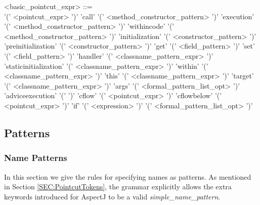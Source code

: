 \begin{minipage}{6in}
\begin{blue}
\begin{grammar}
<basic_pointcut_expr> ::= \hspace{1in} \\
       '(' <pointcut_expr> ')'
\alt   'call' '(' <method_constructor_pattern> ')'
\alt   'execution' '(' <method_constructor_pattern> ')'
\alt   'withincode' '(' <method_constructor_pattern> ')'
\alt   'initialization' '(' <constructor_pattern> ')'
\alt   'preinitialization' '(' <constructor_pattern> ')'
\alt   'get' '(' <field_pattern> ')'
\alt   'set' '(' <field_pattern> ')'
\alt   'handler' '(' <classname_pattern_expr> ')'
\alt   'staticinitialization' '(' <classname_pattern_expr> ')'
\alt   'within' '(' <classname_pattern_expr> ')'
\alt   'this' '(' <classname_pattern_expr> ')'
\alt   'target' '(' <classname_pattern_expr> ')'
\alt   'args' '(' <formal_pattern_list_opt> ')'
\alt   'adviceexecution' '(' ')'
\alt   'cflow' '(' <pointcut_expr> ')'
\alt   'cflowbelow' '(' <pointcut_expr> ')'
\alt   'if' '(' {\red <expression> } ')'
 '(' <formal_pattern_list_opt> ')'
\end{grammar}
\end{blue}
\end{minipage}


\subsection{Patterns}

\subsubsection{Name Patterns \label{SEC:NamePatterns}}

In this section we give the rules for specifying names as
patterns.   As mentioned in Section \ref{SEC:PointcutTokens}, 
the grammar explicitly allows the extra keywords introduced for
AspectJ to be a valid {\em simple\_name\_pattern}.

